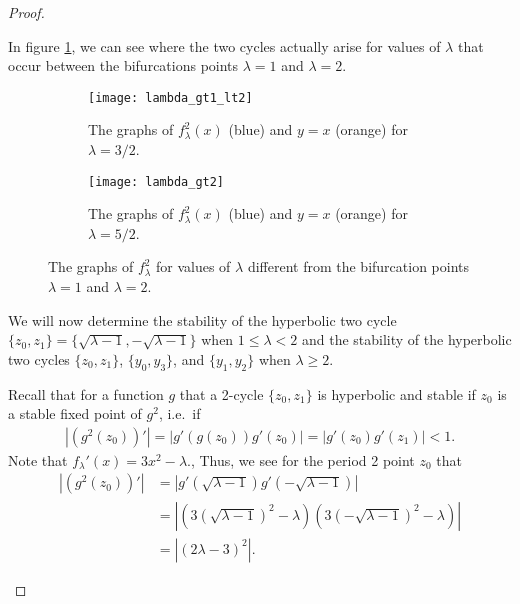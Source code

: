 \begin{proof}
\begin{enumerate}
      In figure \ref{between}, we can see where the two cycles actually arise for values of $\lambda$ that occur
      between the bifurcations points $\lambda = 1$ and $\lambda = 2$.

      \begin{figure}[!h]
        \centering
        \begin{subfigure}{.45\textwidth}
          \centering
          \centerline{\texttt{[image: lambda\_gt1\_lt2]}}
          \caption{The graphs of $f_\lambda^2(x)$ (blue) and $y=x$ (orange) for $\lambda = 3/2$.}
        \end{subfigure}
        \begin{subfigure}{.45\textwidth}
          \centering
          \centerline{\texttt{[image: lambda\_gt2]}}
          \caption{The graphs of $f_\lambda^2(x)$ (blue) and $y=x$ (orange) for $\lambda = 5/2$.}
        \end{subfigure}
        \caption{The graphs of $f_\lambda^2$ for values of $\lambda$ different from  the bifurcation points $\lambda=1$ and $\lambda=2$. }
        \label{between}
      \end{figure}

      We will now determine the stability of the hyperbolic two cycle $\{z_0, z_1\} = \{\sqrt{\lambda - 1}, -\sqrt{\lambda - 1}\}$ when $1 \leq \lambda < 2$
      and the stability of the hyperbolic two cycles $\{z_0, z_1\}$, $\{y_0, y_3\}$, and $\{y_1, y_2\}$ when $\lambda \geq 2$.

      Recall that for a function $g$ that a 2-cycle $\{z_0, z_1\}$ is hyperbolic and stable if
      $z_0$ is a stable fixed point of $g^2$, i.e.\ if
      \begin{align*}
        |(g^2(z_0))'| = |g'(g(z_0))g'(z_0)| = |g'(z_0)g'(z_1)| < 1.
      \end{align*}
      Note that $f_\lambda'(x) = 3x^2 - \lambda.$, Thus, we see  for the period 2 point $z_0$ that
      \begin{align*}
        \left|(g^2(z_0))'\right| &= \left|g'\left(\sqrt{\lambda - 1}\right)g'\left(-\sqrt{\lambda - 1}\right)\right| \\
        &= \left|\left(3\left(\sqrt{\lambda - 1}\right)^2 - \lambda\right)\left(3\left(-\sqrt{\lambda - 1}\right)^2 - \lambda\right)\right| \\
        &= \left|(2\lambda - 3)^2\right|.
      \end{align*}


\end{enumerate}
\end{proof}
